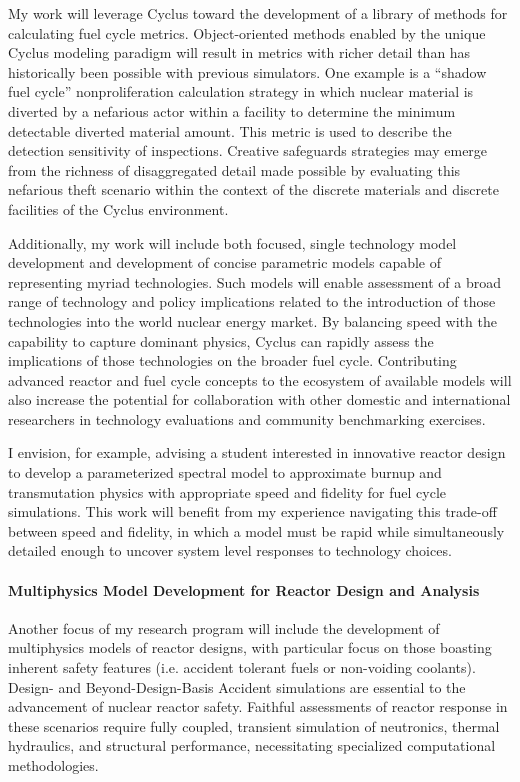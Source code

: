 \documentclass[a4paper, 12pt]{article}
\begin{document}
My work will leverage Cyclus toward the development of a library 
of methods for calculating fuel cycle metrics.  Object-oriented methods enabled 
by the unique Cyclus modeling paradigm will result in metrics with richer detail 
than has historically been possible with previous simulators. One example is a 
``shadow fuel cycle'' nonproliferation calculation strategy in which nuclear material is 
diverted by a nefarious actor within a facility to determine the minimum 
detectable diverted material amount.  This metric is used to describe the 
detection sensitivity of inspections.  Creative safeguards strategies may emerge 
from the richness of disaggregated detail made possible by evaluating this 
nefarious theft scenario within the context of the discrete materials and 
discrete facilities of the Cyclus environment.

Additionally, my work will include both focused, single technology model development and 
development of concise parametric models capable of representing myriad 
technologies.  Such models will enable assessment of a broad range of technology 
and policy implications related to the introduction of those technologies into 
the world nuclear energy market. By balancing speed with the capability to 
capture dominant physics, Cyclus can rapidly assess the implications of those 
technologies on the broader fuel cycle.  Contributing advanced reactor and fuel 
cycle concepts to the ecosystem of available models will also increase the 
potential for collaboration with other domestic and international researchers in 
technology evaluations and community benchmarking exercises.

I envision, for example, advising a student interested in innovative reactor 
design to develop a parameterized spectral model to approximate burnup and 
transmutation physics with appropriate speed and fidelity for fuel cycle 
simulations.  This work will benefit from my experience navigating this 
trade-off between speed and fidelity, in which a model must be rapid while 
simultaneously detailed enough to uncover system level responses to technology 
choices.


\paragraph{Multiphysics Model Development for Reactor Design and Analysis}

Another focus of my research program will include the development of 
multiphysics models of reactor designs, with particular focus on those boasting 
inherent safety features (i.e. accident tolerant fuels or non-voiding coolants).  
Design- and Beyond-Design-Basis Accident simulations are essential to the 
advancement of nuclear reactor safety. Faithful assessments of reactor response 
in these scenarios require fully coupled, transient simulation of neutronics, 
thermal hydraulics, and structural performance, necessitating specialized 
computational methodologies. 
\end{document}
